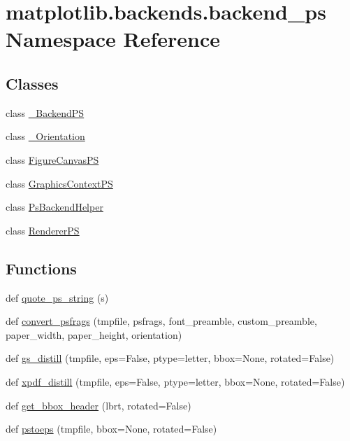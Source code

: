 \hypertarget{namespacematplotlib_1_1backends_1_1backend__ps}{}\section{matplotlib.\+backends.\+backend\+\_\+ps Namespace Reference}
\label{namespacematplotlib_1_1backends_1_1backend__ps}
\subsection*{Classes}
\begin{DoxyCompactItemize}
\item 
class \hyperlink{classmatplotlib_1_1backends_1_1backend__ps_1_1__BackendPS}{\+\_\+\+Backend\+PS}
\item 
class \hyperlink{classmatplotlib_1_1backends_1_1backend__ps_1_1__Orientation}{\+\_\+\+Orientation}
\item 
class \hyperlink{classmatplotlib_1_1backends_1_1backend__ps_1_1FigureCanvasPS}{Figure\+Canvas\+PS}
\item 
class \hyperlink{classmatplotlib_1_1backends_1_1backend__ps_1_1GraphicsContextPS}{Graphics\+Context\+PS}
\item 
class \hyperlink{classmatplotlib_1_1backends_1_1backend__ps_1_1PsBackendHelper}{Ps\+Backend\+Helper}
\item 
class \hyperlink{classmatplotlib_1_1backends_1_1backend__ps_1_1RendererPS}{Renderer\+PS}
\end{DoxyCompactItemize}
\subsection*{Functions}
\begin{DoxyCompactItemize}
\item 
def \hyperlink{namespacematplotlib_1_1backends_1_1backend__ps_a31f00859c83b0ee81dc0c94f7b04fa3a}{quote\+\_\+ps\+\_\+string} (s)
\item 
def \hyperlink{namespacematplotlib_1_1backends_1_1backend__ps_af560d5ec999b291773f8e33c7dd4a2b9}{convert\+\_\+psfrags} (tmpfile, psfrags, font\+\_\+preamble, custom\+\_\+preamble, paper\+\_\+width, paper\+\_\+height, orientation)
\item 
def \hyperlink{namespacematplotlib_1_1backends_1_1backend__ps_aa073edde5521a77fbc430126ea9ec543}{gs\+\_\+distill} (tmpfile, eps=False, ptype=\textquotesingle{}letter\textquotesingle{}, bbox=None, rotated=False)
\item 
def \hyperlink{namespacematplotlib_1_1backends_1_1backend__ps_a8b81a9d051e4d7fcd45aa47e3194b555}{xpdf\+\_\+distill} (tmpfile, eps=False, ptype=\textquotesingle{}letter\textquotesingle{}, bbox=None, rotated=False)
\item 
def \hyperlink{namespacematplotlib_1_1backends_1_1backend__ps_a0f26fb55b593a427cc527b17be0e1c9d}{get\+\_\+bbox\+\_\+header} (lbrt, rotated=False)
\item 
def \hyperlink{namespacematplotlib_1_1backends_1_1backend__ps_abf2b9867da37a4a872b54cc23f9a8c86}{pstoeps} (tmpfile, bbox=None, rotated=False)
\end{DoxyCompactItemize}

